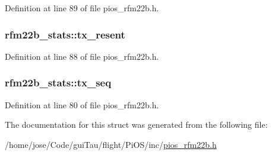 Definition at line 89 of file pios\-\_\-rfm22b.\-h.

\hypertarget{structrfm22b__stats_aad4359c902f65048dd74b5b5a4d9482d}{
\subsubsection[{tx\-\_\-resent}]{ rfm22b\-\_\-stats\-::tx\-\_\-resent}}\label{structrfm22b__stats_aad4359c902f65048dd74b5b5a4d9482d}


Definition at line 88 of file pios\-\_\-rfm22b.\-h.

\hypertarget{structrfm22b__stats_a8279ef420f8e1d3c6773b8cb528f5122}{
\subsubsection[{tx\-\_\-seq}]{ rfm22b\-\_\-stats\-::tx\-\_\-seq}}\label{structrfm22b__stats_a8279ef420f8e1d3c6773b8cb528f5122}


Definition at line 80 of file pios\-\_\-rfm22b.\-h.



The documentation for this struct was generated from the following file\-:\begin{DoxyCompactItemize}
\item 
/home/jose/\-Code/gui\-Tau/flight/\-Pi\-O\-S/inc/\hyperlink{pios__rfm22b_8h}{pios\-\_\-rfm22b.\-h}\end{DoxyCompactItemize}
